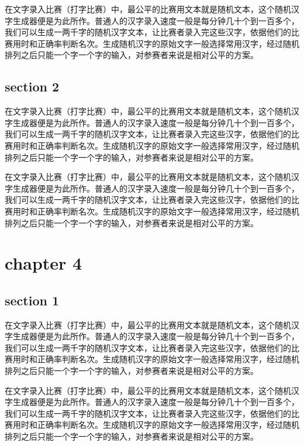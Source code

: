 \documentclass[12pt,hyperref,UTF8]{ctexbook}
\begin{document}
在文字录入比赛（打字比赛）中，最公平的比赛用文本就是随机文本，这个随机汉字生成器便是为此所作。普通人的汉字录入速度一般是每分钟几十个到一百多个，我们可以生成一两千字的随机汉字文本，让比赛者录入完这些汉字，依据他们的比赛用时和正确率判断名次。生成随机汉字的原始文字一般选择常用汉字，经过随机排列之后只能一个字一个字的输入，对参赛者来说是相对公平的方案。

\section{section 2}

在文字录入比赛（打字比赛）中，最公平的比赛用文本就是随机文本，这个随机汉字生成器便是为此所作。普通人的汉字录入速度一般是每分钟几十个到一百多个，我们可以生成一两千字的随机汉字文本，让比赛者录入完这些汉字，依据他们的比赛用时和正确率判断名次。生成随机汉字的原始文字一般选择常用汉字，经过随机排列之后只能一个字一个字的输入，对参赛者来说是相对公平的方案。

在文字录入比赛（打字比赛）中，最公平的比赛用文本就是随机文本，这个随机汉字生成器便是为此所作。普通人的汉字录入速度一般是每分钟几十个到一百多个，我们可以生成一两千字的随机汉字文本，让比赛者录入完这些汉字，依据他们的比赛用时和正确率判断名次。生成随机汉字的原始文字一般选择常用汉字，经过随机排列之后只能一个字一个字的输入，对参赛者来说是相对公平的方案。

\cleardoublepage
\chapter{chapter 4}

\section{section 1}

在文字录入比赛（打字比赛）中，最公平的比赛用文本就是随机文本，这个随机汉字生成器便是为此所作。普通人的汉字录入速度一般是每分钟几十个到一百多个，我们可以生成一两千字的随机汉字文本，让比赛者录入完这些汉字，依据他们的比赛用时和正确率判断名次。生成随机汉字的原始文字一般选择常用汉字，经过随机排列之后只能一个字一个字的输入，对参赛者来说是相对公平的方案。

在文字录入比赛（打字比赛）中，最公平的比赛用文本就是随机文本，这个随机汉字生成器便是为此所作。普通人的汉字录入速度一般是每分钟几十个到一百多个，我们可以生成一两千字的随机汉字文本，让比赛者录入完这些汉字，依据他们的比赛用时和正确率判断名次。生成随机汉字的原始文字一般选择常用汉字，经过随机排列之后只能一个字一个字的输入，对参赛者来说是相对公平的方案。
\end{document}

